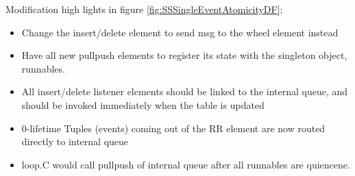 \documentclass{article}
\begin{document}
Modification high lights in figure \ref{fig:SSSingleEventAtomicityDF}:
\begin{itemize}
	\item Change the insert/delete element to send msg to the wheel element instead
	\item Have all new pullpush elements to register its state with the singleton object, runnables.
	\item All insert/delete listener elements should be linked to the internal queue, and should be
		invoked immediately when the table is updated
	\item 0-lifetime Tuples (events) coming out of the RR element are now routed directly to
		internal queue
	\item loop.C would call pullpush of internal queue after all runnables are quiencene. 
\end{itemize}


\end{document}
